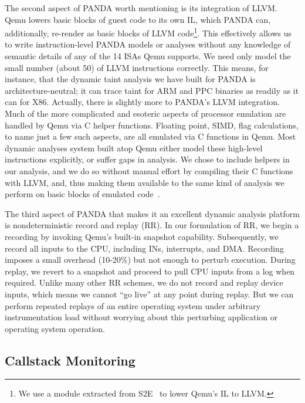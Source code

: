 The second aspect of PANDA worth mentioning is its integration of LLVM.
Qemu lowers basic blocks of guest code to its own IL, which PANDA can, additionally, re-render as basic blocks of LLVM code\footnote{We use a module extracted from S2E~\cite{Chipounov:2011s2e} to lower Qemu's IL to LLVM.}.
This effectively allows us to write instruction-level PANDA models or analyses without any knowledge of semantic details of any of the 14 ISAs Qemu supports.
We need only model the small number (about 50) of LLVM instructions correctly.
This means, for instance, that the dynamic taint analysis we have built for PANDA is architecture-neutral; it can trace taint for ARM and PPC binaries as readily as it can for X86.
Actually, there is slightly more to PANDA's LLVM integration. 
Much of the more complicated and esoteric aspects of processor emulation are handled by Qemu via C helper functions.
Floating point, SIMD, flag calculations, to name just a few such aspects, are all emulated via C functions in Qemu.
Most dynamic analyses system built atop Qemu either model these high-level instructions explicitly, or suffer gaps in analysis. 
We chose to include helpers in our analysis, and we do so without manual effort by compiling their C functions with LLVM, and, thus making them available to the same kind of analysis we perform on basic blocks of emulated code~\cite{Whelan:2013architecture}.

The third aspect of PANDA that makes it an excellent dynamic analysis platform is nondeterministic record and replay (RR).  
In our formulation of RR, we begin a recording by invoking Qemu's built-in snapshot capability.
Subsequently, we record all inputs to the CPU, including INs, interrupts, and DMA.
Recording imposes a small overhead (10-20\%) but not enough to perturb execution.
During replay, we revert to a snapshot and proceed to pull CPU inputs from a log when required.
Unlike many other RR schemes, we do not record and replay device inputs, which means we cannot ``go live'' at any point during replay.
But we can perform repeated replays of an entire operating system under arbitrary instrumentation load without worrying about this perturbing application or operating system operation.  

\subsection{Callstack Monitoring}
\label{sec:implementation:subsec:callstack}


